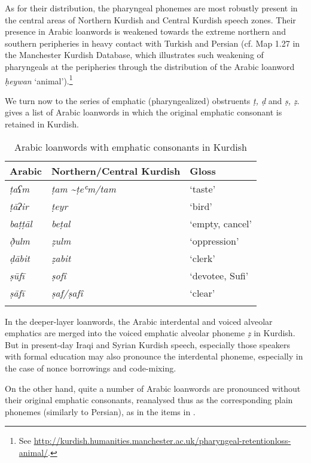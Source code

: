 \documentclass[output=paper]{langsci/langscibook}
\begin{document}
As for their distribution, the pharyngeal phonemes are most robustly present in the central areas of Northern Kurdish and Central Kurdish speech zones. Their presence in Arabic loanwords is weakened towards the extreme northern and southern peripheries in heavy contact with Turkish and Persian (cf. Map 1.27 in the Manchester Kurdish Database, which illustrates such weakening of pharyngeals at the peripheries through the distribution of the Arabic loanword \textit{ḥeywan} ‘animal’).\footnote{See \url{http://kurdish.humanities.manchester.ac.uk/pharyngeal-retentionloss-animal/}.}

We turn now to the series of emphatic (pharyngealized) obstruents \textit{ṭ, ḍ} and \textit{ṣ, ẓ}.  gives a list of Arabic loanwords in which the original emphatic consonant is retained in Kurdish. 

\begin{table}
\begin{tabular}{lll}
\lsptoprule
Arabic & Northern/Central Kurdish & Gloss\\\midrule
\textit{ṭaʕm}   & \textit{ṭam \textasciitilde ṭeʿm\slash tam} & ‘taste’\\ 
\textit{ṭāʔir}  & \textit{ṭeyr}                               & ‘bird’\\ 
\textit{baṭṭāl} & \textit{beṭal}                              & ‘empty, cancel’\\ 
\textit{ð̣ulm}  & \textit{ẓulm}                               & ‘oppression’\\ 
\textit{ḍābit}  & \textit{ẓabit}                              & ‘clerk’\\ 
\textit{ṣūfī}   & \textit{ṣofî}                               & ‘devotee, Sufi’\\ 
\textit{ṣāfī}   & \textit{ṣaf/ṣafî}                           & ‘clear’\\
\lspbottomrule
\end{tabular}
\caption{Arabic loanwords with emphatic consonants in Kurdish\label{tab:opengin:5}}
\end{table}

In the deeper-layer loanwords, the Arabic interdental and voiced alveolar emphatics are merged into the voiced emphatic alveolar phoneme \textit{ẓ} in Kurdish. But in present-day Iraqi and Syrian Kurdish speech, especially those speakers with formal education may also pronounce the interdental phoneme, especially in the case of nonce borrowings and code-mixing.  

On the other hand, quite a number of Arabic loanwords are pronounced without their original emphatic consonants, reanalysed thus as the corresponding plain phonemes (similarly to Persian), as in the items in . 
\end{document}
